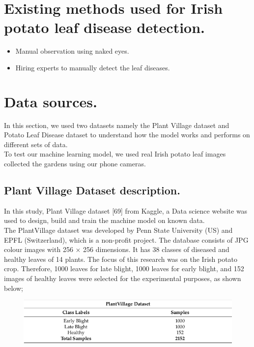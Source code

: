 \documentclass[11pt]{report}
\begin{document}
\section{Existing methods used for Irish potato leaf disease detection.}
\begin{itemize}
	\item Manual observation using naked eyes.\\
	\item Hiring experts to manually detect the leaf diseases.\\
	
	
\end{itemize}

\section{Data sources.}
In this section, we used two datasets namely the Plant Village dataset and Potato Leaf Disease dataset to understand how the model works and performs on different sets of data.\\
To test our machine learning model, we used real Irish potato leaf images collected the gardens using our phone cameras.\\

\subsection{Plant Village Dataset description.}
In this study, Plant Village dataset [69] from Kaggle, a Data science website was used to design, build and train the machine model on known data.\\
The PlantVillage dataset was developed by Penn State University (US) and EPFL (Switzerland), which is a non-profit project. The
database consists of JPG colour images with 256 × 256 dimensions. It has 38 classes of diseased and healthy leaves of 14 plants. The focus of this research was on the Irish potato crop.
Therefore, 1000 leaves for late blight, 1000 leaves for early blight, and 152 images of healthy
leaves were selected for the experimental purposes, as shown below;\\
\begin{figure}[h]
	\centerline{\small 
		\includegraphics[height=0.1\textheight]  {l3}}
\end{figure}
\end{document}
